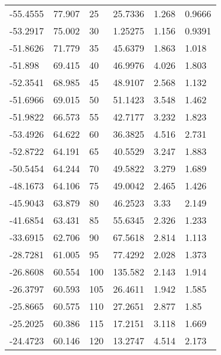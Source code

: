 \begin{longtable}[c]{@{}llllll@{}}
-55.4555 & 77.907 & 25 & 25.7336 & 1.268 & 0.9666 \\
-53.2917 & 75.002 & 30 & 1.25275 & 1.156 & 0.9391 \\
-51.8626 & 71.779 & 35 & 45.6379 & 1.863 & 1.018 \\
-51.898 & 69.415 & 40 & 46.9976 & 4.026 & 1.803 \\
-52.3541 & 68.985 & 45 & 48.9107 & 2.568 & 1.132 \\
-51.6966 & 69.015 & 50 & 51.1423 & 3.548 & 1.462 \\
-51.9822 & 66.573 & 55 & 42.7177 & 3.232 & 1.823 \\
-53.4926 & 64.622 & 60 & 36.3825 & 4.516 & 2.731 \\
-52.8722 & 64.191 & 65 & 40.5529 & 3.247 & 1.883 \\
-50.5454 & 64.244 & 70 & 49.5822 & 3.279 & 1.689 \\
-48.1673 & 64.106 & 75 & 49.0042 & 2.465 & 1.426 \\
-45.9043 & 63.879 & 80 & 46.2523 & 3.33 & 2.149 \\
-41.6854 & 63.431 & 85 & 55.6345 & 2.326 & 1.233 \\
-33.6915 & 62.706 & 90 & 67.5618 & 2.814 & 1.113 \\
-28.7281 & 61.005 & 95 & 77.4292 & 2.028 & 1.373 \\
-26.8608 & 60.554 & 100 & 135.582 & 2.143 & 1.914 \\
-26.3797 & 60.593 & 105 & 26.4611 & 1.942 & 1.585 \\
-25.8665 & 60.575 & 110 & 27.2651 & 2.877 & 1.85 \\
-25.2025 & 60.386 & 115 & 17.2151 & 3.118 & 1.669 \\
-24.4723 & 60.146 & 120 & 13.2747 & 4.514 & 2.173 \\* \bottomrule
\end{longtable}
